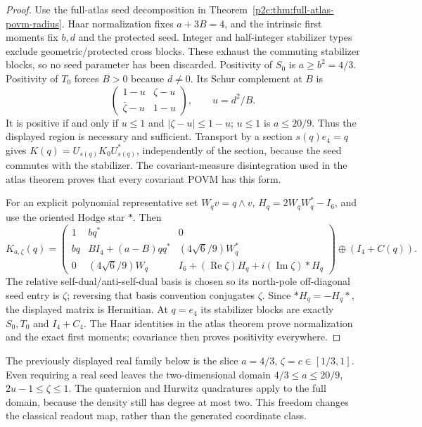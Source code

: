 \documentclass[11pt,a4paper]{article}
\begin{document}
\begin{proof}
Use the full-atlas seed decomposition in
Theorem~\ref{p2c:thm:full-atlas-povm-radius}.  Haar normalization fixes
$a+3B=4$, and the intrinsic first moments fix $b,d$ and the protected seed.
Integer and half-integer stabilizer types exclude geometric/protected cross
blocks.  These exhaust the commuting stabilizer blocks, so no seed parameter
has been discarded.
Positivity of $S_0$ is $a\ge b^2=4/3$.
Positivity of $T_0$ forces $B>0$ because $d\ne0$.
Its Schur complement at $B$ is
\[
 \begin{pmatrix}1-u&\zeta-u\\\bar\zeta-u&1-u\end{pmatrix},
 \qquad u=d^2/B.
\]
It is positive if and only if $u\le1$ and
$|\zeta-u|\le1-u$; $u\le1$ is $a\le20/9$.
Thus the displayed region is necessary and sufficient.
Transport by a section $s(q)e_4=q$ gives
$K(q)=U_{s(q)}K_0U_{s(q)}^*$, independently of the section, because the
seed commutes with the stabilizer.  The covariant-measure disintegration
used in the atlas theorem proves that every covariant POVM has this form.

For an explicit polynomial representative set $W_qv=q\wedge v$,
$H_q=2W_qW_q^*-I_6$, and use the oriented Hodge star $*$.  Then
\[
 K_{a,\zeta}(q)=
 \begin{pmatrix}
 1&bq^*&0\\
 bq&B I_4+(a-B)qq^*&(4\sqrt6/9)W_q^*\\
 0&(4\sqrt6/9)W_q&I_6+(\operatorname{Re}\zeta)H_q
                  +i(\operatorname{Im}\zeta)*H_q
 \end{pmatrix}\oplus(I_4+C(q)).
\]
The relative self-dual/anti-self-dual basis is chosen so its north-pole
off-diagonal seed entry is $\zeta$; reversing that basis convention
conjugates $\zeta$.  Since $*H_q=-H_q*$, the displayed matrix is Hermitian.
At $q=e_4$ its stabilizer blocks are exactly $S_0,T_0$ and $I_4+C_4$.
The Haar identities in the atlas theorem prove normalization and the exact
first moments; covariance then proves positivity everywhere.
\end{proof}
The previously displayed real family below is the slice
$a=4/3$, $\zeta=c\in[1/3,1]$.
Even requiring a real seed leaves the two-dimensional domain
$4/3\le a\le20/9$, $2u-1\le\zeta\le1$.
The quaternion and Hurwitz quadratures apply to the full domain, because
the density still has degree at most two.  This freedom changes the
classical readout map, rather than the generated coordinate class.
\end{document}
